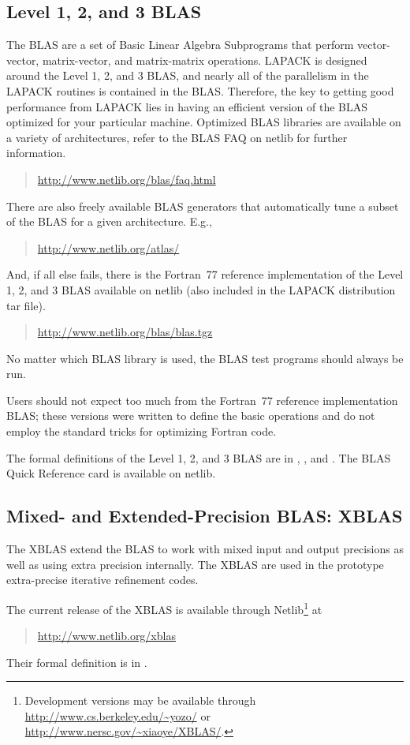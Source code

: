 \documentclass[11pt]{report}
\begin{document}
\subsection{Level 1, 2, and 3 BLAS}

The BLAS are a set of Basic Linear Algebra Subprograms that perform
vector-vector, matrix-vector, and matrix-matrix operations.
LAPACK is designed around the Level 1, 2, and 3 BLAS, and nearly all
of the parallelism in the LAPACK routines is contained in the BLAS.
Therefore,
the key to getting good performance from LAPACK lies in having an
efficient version of the BLAS optimized for your particular machine.
Optimized BLAS libraries are available on a variety of architectures,
refer to the BLAS FAQ on netlib for further information.
\begin{quote}
\url{http://www.netlib.org/blas/faq.html}
\end{quote}
There are also freely available BLAS generators that automatically
tune a subset of the BLAS for a given architecture.  E.g.,
\begin{quote}
\url{http://www.netlib.org/atlas/}
\end{quote}
And, if all else fails, there is the Fortran~77 reference implementation
of the Level 1, 2, and 3 BLAS available on netlib (also included in
the LAPACK distribution tar file).
\begin{quote}
\url{http://www.netlib.org/blas/blas.tgz}
\end{quote}
No matter which BLAS library is used, the BLAS test programs should
always be run.

Users should not expect too much from the Fortran~77 reference implementation
BLAS; these versions were written to define the basic operations and do not
employ the standard tricks for optimizing Fortran code.

The formal definitions of the Level 1, 2, and 3 BLAS
are in \cite{BLAS1}, \cite{BLAS2}, and \cite{BLAS3}.
The BLAS Quick Reference card is available on netlib.

\subsection{Mixed- and Extended-Precision BLAS: XBLAS}

The XBLAS extend the BLAS to work with mixed input and output
precisions as well as using extra precision internally.  The XBLAS are
used in the prototype extra-precise iterative refinement codes.

The current release of the XBLAS is available through
Netlib\footnote{Development versions may be available through
  \url{http://www.cs.berkeley.edu/~yozo/} or
  \url{http://www.nersc.gov/~xiaoye/XBLAS/}.}  at
\begin{quote}
  \url{http://www.netlib.org/xblas}
\end{quote}
Their formal definition is in \cite{XBLAS}.
\end{document}
